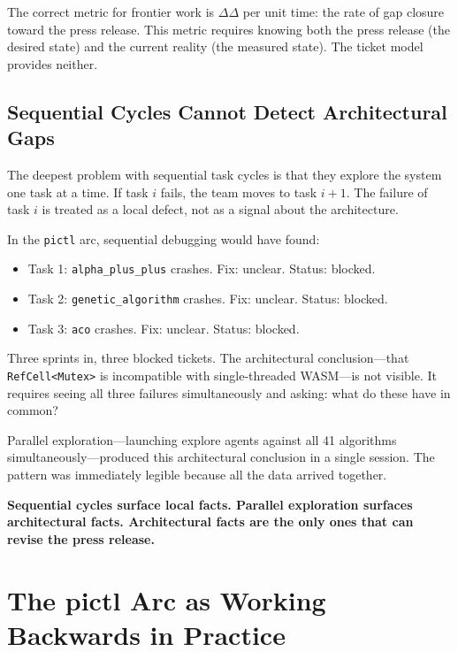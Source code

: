 \documentclass[11pt,a4paper]{article}
\newcommand{\code}[1]{\texttt{#1}}
\newcommand{\gap}{\Delta}
\begin{document}
The correct metric for frontier work is $\Delta\gap$ per unit time: the rate
of gap closure toward the press release.  This metric requires knowing both
the press release (the desired state) and the current reality (the measured
state).  The ticket model provides neither.

\subsection{Sequential Cycles Cannot Detect Architectural Gaps}

The deepest problem with sequential task cycles is that they explore the
system one task at a time.  If task $i$ fails, the team moves to task $i+1$.
The failure of task $i$ is treated as a local defect, not as a signal about
the architecture.

In the \code{pictl} arc, sequential debugging would have found:
\begin{itemize}
  \item Task 1: \code{alpha\_plus\_plus} crashes. Fix: unclear. Status: blocked.
  \item Task 2: \code{genetic\_algorithm} crashes. Fix: unclear. Status: blocked.
  \item Task 3: \code{aco} crashes. Fix: unclear. Status: blocked.
\end{itemize}

Three sprints in, three blocked tickets.  The architectural conclusion---that
\code{RefCell<Mutex>} is incompatible with single-threaded WASM---is not
visible.  It requires seeing all three failures simultaneously and asking:
what do these have in common?

Parallel exploration---launching explore agents against all 41 algorithms
simultaneously---produced this architectural conclusion in a single session.
The pattern was immediately legible because all the data arrived together.

\textbf{Sequential cycles surface local facts.  Parallel exploration surfaces
architectural facts.  Architectural facts are the only ones that can revise the
press release.}

\section{The pictl Arc as Working Backwards in Practice}
\end{document}
